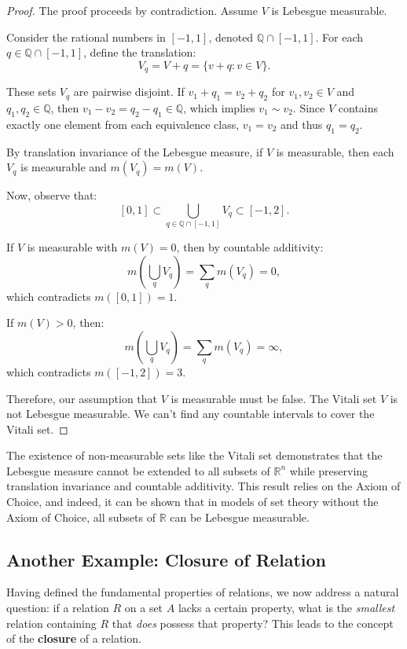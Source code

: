 \begin{proof}
The proof proceeds by contradiction. Assume \( V \) is Lebesgue measurable.

Consider the rational numbers in \([-1,1]\), denoted \(\mathbb{Q} \cap [-1,1]\). For each \( q \in \mathbb{Q} \cap [-1,1] \), define the translation:
\[
V_q = V + q = \{ v + q : v \in V \}.
\]

These sets \( V_q \) are pairwise disjoint. If \( v_1 + q_1 = v_2 + q_2 \) for \( v_1, v_2 \in V \) and \( q_1, q_2 \in \mathbb{Q} \), then \( v_1 - v_2 = q_2 - q_1 \in \mathbb{Q} \), which implies \( v_1 \sim v_2 \). Since \( V \) contains exactly one element from each equivalence class, \( v_1 = v_2 \) and thus \( q_1 = q_2 \).

By translation invariance of the Lebesgue measure, if \( V \) is measurable, then each \( V_q \) is measurable and \( m(V_q) = m(V) \).

Now, observe that:
\[
[0,1] \subset \bigcup_{q \in \mathbb{Q} \cap [-1,1]} V_q \subset [-1,2].
\]

If \( V \) is measurable with \( m(V) = 0 \), then by countable additivity:
\[
m\left( \bigcup_{q} V_q \right) = \sum_{q} m(V_q) = 0,
\]
which contradicts \( m([0,1]) = 1 \).

If \( m(V) > 0 \), then:
\[
m\left( \bigcup_{q} V_q \right) = \sum_{q} m(V_q) = \infty,
\]
which contradicts \( m([-1,2]) = 3 \).

Therefore, our assumption that \( V \) is measurable must be false. The Vitali set \( V \) is not Lebesgue measurable. We can't find any countable intervals to cover the Vitali set.
\end{proof}


\begin{remark}
The existence of non-measurable sets like the Vitali set demonstrates that the Lebesgue measure cannot be extended to all subsets of \(\mathbb{R}^n\) while preserving translation invariance and countable additivity. This result relies on the Axiom of Choice, and indeed, it can be shown that in models of set theory without the Axiom of Choice, all subsets of \(\mathbb{R}\) can be Lebesgue measurable.
\end{remark}

\subsection{Another Example: Closure of Relation}
Having defined the fundamental properties of relations, we now address a natural question: if a relation $R$ on a set $A$ lacks a certain property, what is the \emph{smallest} relation containing $R$ that \emph{does} possess that property? This leads to the concept of the \textbf{closure} of a relation.

